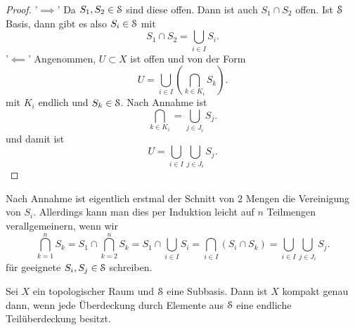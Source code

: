 \begin{proof}
'$\implies$'    Da $S_1,S_2 \in \mathcal{S}$ sind diese offen. Dann ist auch $S_1\cap S_2$ offen. Ist $\mathcal{S}$ Basis, dann gibt es also  $S_i \in  \mathcal{S}$ mit 
\[
S_1 \cap  S_2 = \bigcup_{i \in  I} S_i
.\] 
'$\impliedby$' Angenommen, $U\subset X$ ist offen und von der Form
\[
    U = \bigcup_{i \in  I} \left( \bigcap_{k\in K_i} S_k \right) 
.\] 
mit $K_i$ endlich und  $S_k \in  \mathcal{S}$. Nach Annahme ist
\[
\bigcap_{k\in K_i} = \bigcup_{j\in J_i} S_j  
.\] 
und damit ist
\[
U = \bigcup_{i\in I} \bigcup_{j\in J_i} S_j  
.\] 
\end{proof}
\begin{remark*}
    Nach Annahme ist eigentlich erstmal der Schnitt von 2 Mengen die Vereinigung von $S_i$. Allerdings kann man dies per Induktion leicht auf  $n$ Teilmengen verallgemeinern, wenn wir
     \[
         \bigcap_{k=1}^n S_k = S_1 \cap  \bigcap_{k=2}^{n} S_k = S_1 \cap \bigcup_{i\in I} S_i = \bigcap_{i\in I} (S_i \cap S_k) = \bigcup_{i\in I} \bigcup_{j\in J_i} S_j  
    .\]
    für geeignete $S_i, S_j\in \mathcal{S}$ schreiben.
\end{remark*}
\begin{theorem}\label{thm:alexander}
    Sei $X$ ein topologischer Raum und  $\mathcal{S}$ eine Subbasis. Dann ist  $X$ kompakt genau dann, wenn jede Überdeckung durch Elemente aus  $\mathcal{S}$ eine endliche Teilüberdeckung besitzt.
\end{theorem}
